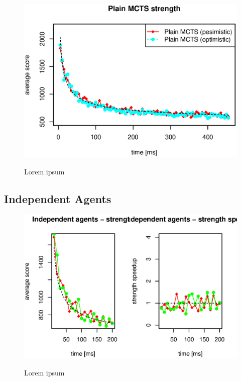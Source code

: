 \begin{figure}
\begin{center}
\includegraphics{img/plain-mcts-strength.eps}
\end{center}
\caption{\footnotesize Lorem ipsum}{\footnotesize }
\label{fig_plain_mcts_strength}
\end{figure}

\subsection{Independent Agents}

\begin{figure}
\begin{center}
\includegraphics{img/dummy-ghosts-strength.eps}
\end{center}
\caption{\footnotesize Lorem ipsum}{\footnotesize }
\label{fig_independen_agents_strength}
\end{figure}


